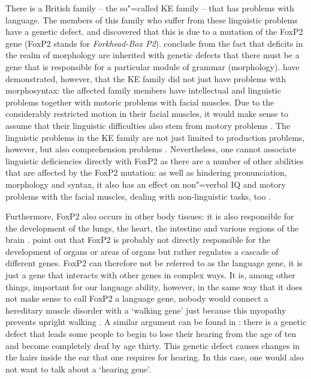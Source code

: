 There is a British family -- the so"=called KE family -- that has problems with language.
The members of this family who suffer from these linguistic problems have a genetic defect. \citet{FVKWMP98a} and \citet{LFHVM2001a}
discovered that this is due to a mutation of the FoxP2 gene (FoxP2 stands for \emph{Forkhead-Box P2}).
\citet{GC91a} conclude from the fact that deficits in the realm of morphology are inherited with genetic defects that
there must be a gene that is responsible for a particular module of grammar (morphology).
\citet[]{VKWAFP95a} have demonstrated, however, that the KE family did not just have problems with morphosyntax:
the affected family members have intellectual and linguistic problems together with motoric problems with facial muscles.
Due to the considerably restricted motion in their facial muscles, it would make sense to assume that their linguistic difficulties also
stem from motory problems \citep[]{Tomasello2003a}. The linguistic problems in the KE family are not just limited
to production problems, however, but also comprehension problems \citep[]{Bishop2002a}.
Nevertheless, one cannot associate linguistic deficiencies directly with FoxP2 as there are a number of other abilities that
are affected by the FoxP2 mutation: as well as hindering pronunciation, morphology and syntax, it also has an effect on
non"=verbal IQ and motory problems with the facial muscles, dealing with non-linguistic tasks, too \citep{VKWAFP95a}.

%
Furthermore, FoxP2 also occurs in other body tissues: it is also responsible for the development of
the lungs, the heart, the intestine and various regions of the brain \citep{MF2003a}. \citet[--261]{MF2003a} point out that FoxP2 is probably not directly responsible for the development
of organs or areas of organs but rather regulates a cascade of different genes. FoxP2 can therefore
not be referred to as the language gene, it is just a gene that interacts with other genes in
complex ways.  It is, among other things, important for our language ability, however, in the same
way that it does not make sense to call FoxP2 a language gene, nobody would connect a hereditary
muscle disorder with a `walking gene' just because this myopathy prevents upright walking
\citep[]{Bishop2002a}.  A similar argument can be found in \citet[]{Karmiloff-Smith98a}: 
there is a genetic defect that leads some people to begin to lose their hearing from the age of ten
and become completely deaf by age thirty. This genetic defect
causes changes in the hairs inside the ear that one requires for hearing. In this case, one would
also not want to talk about a `hearing gene'.

